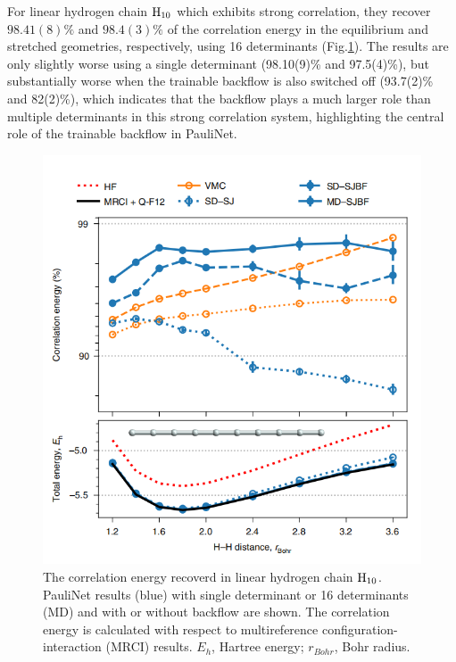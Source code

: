 \documentclass[12pt]{article}
\begin{document}
For linear hydrogen chain $\rm H_{10}$ which exhibits strong correlation, they recover 
$98.41(8)\%$ and $98.4(3)\%$ of the correlation energy in the equilibrium and 
stretched geometries, respectively, using 16 determinants (Fig.\ref{img5}). The 
results are only slightly worse using a single determinant (98.10(9)\% and 97.5(4)\%), 
but substantially worse when the trainable backflow is also switched off (93.7(2)\% 
and 82(2)\%), which indicates that the backflow plays a much larger role than 
multiple determinants in this strong correlation system,  highlighting the central 
role of the trainable backflow in PauliNet. 
\begin{figure}[H]
    \centering
    \includegraphics[width=13cm]{p5.png}
    \renewcommand{\figurename}{Fig.}
    \caption{The correlation energy recoverd in linear hydrogen chain $\rm H_{10}$. 
    PauliNet results (blue) with single determinant or 16 determinants (MD) and 
    with or without backflow are shown. The correlation energy is calculated with 
    respect to multireference configuration-interaction (MRCI) results. $E_h$, 
    Hartree energy; $r_{Bohr}$, Bohr radius.}
    \label{img5}
\end{figure}
\end{document}
